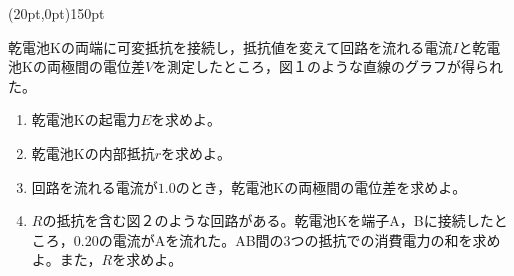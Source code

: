 \hakosyokika
\item
    \begin{mawarikomi}(20pt,0pt){150pt}{
        
        
    }
    乾電池Kの両端に可変抵抗を接続し，抵抗値を変えて回路を流れる電流$I$と乾電池Kの両極間の電位差$V$を測定したところ，図１のような直線のグラフが得られた。
        \begin{enumerate}
            \item 乾電池Kの起電力$E$を求めよ。
            \item 乾電池Kの内部抵抗$r$を求めよ。
            \item 回路を流れる電流が$1.0$のとき，乾電池Kの両極間の電位差を求めよ。
            \item $R$\tanni{\Omega }の抵抗を含む図２のような回路がある。乾電池Kを端子A，Bに接続したところ，$0.20$の電流がAを流れた。AB間の3つの抵抗での消費電力の和を求めよ。また，$R$を求めよ。
        \end{enumerate}
    \end{mawarikomi}